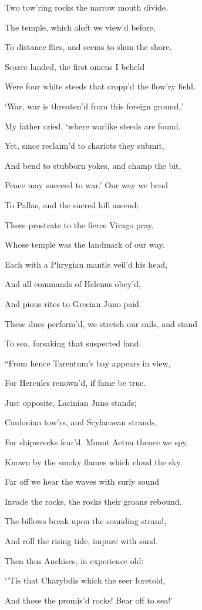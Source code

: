 Two tow’ring rocks the narrow mouth divide.

The temple, which aloft we view’d before,

To distance flies, and seems to shun the shore.

Scarce landed, the first omens I beheld

Were four white steeds that cropp’d the flow’ry field.

‘War, war is threaten’d from this foreign ground,’

My father cried, ‘where warlike steeds are found.

Yet, since reclaim’d to chariots they submit,

And bend to stubborn yokes, and champ the bit,

Peace may succeed to war.’ Our way we bend

To Pallas, and the sacred hill ascend;

There prostrate to the fierce Virago pray,

Whose temple was the landmark of our way.

Each with a Phrygian mantle veil’d his head,

And all commands of Helenus obey’d,

And pious rites to Grecian Juno paid.

These dues perform’d, we stretch our sails, and stand

To sea, forsaking that suspected land.

“From hence Tarentum’s bay appears in view,

For Hercules renown’d, if fame be true.

Just opposite, Lacinian Juno stands;

Caulonian tow’rs, and Scylacaean strands,

For shipwrecks fear’d. Mount Aetna thence we spy,

Known by the smoky flames which cloud the sky.

Far off we hear the waves with surly sound

Invade the rocks, the rocks their groans rebound.

The billows break upon the sounding strand,

And roll the rising tide, impure with sand.

Then thus Anchises, in experience old:

‘’Tis that Charybdis which the seer foretold,

And those the promis’d rocks! Bear off to sea!’

